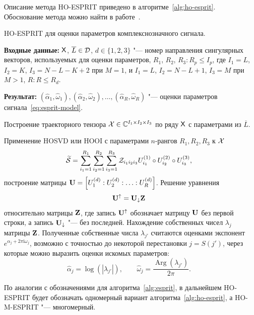 \documentclass[specialist,
  substylefile=spbu_report.rtx,
subf,href,colorlinks=true, 12pt]{disser}
\theoremstyle{plain}
\theoremstyle{definition}
\theoremstyle{remark}
\newcommand{\Input}{\textbf{Входные данные: }}
\newcommand{\Output}{\textbf{Результат: }}
\newcommand{\iu}{\mathrm{i}}
\begin{document}
Описание метода HO-ESPRIT приведено в алгоритме~\ref{alg:ho-esprit}.
Обоснование метода можно найти в работе~\cite{hosvd-hooi-separation}.
\begin{algorithm}[!ht]
  \caption{HO-ESPRIT для оценки параметров комплекснозначного сигнала.}
  \label{alg:ho-esprit}
  \Input $\mathsf{X}$, $\overline{L} \in \mathcal{D}$,
  $d\in \{1, 2, 3\}$ "--- номер направления сингулярных векторов,
  используемых для оценки параметров,
  $R_1$, $R_2$, $R_3: R_p \leqslant I_p$, где
  $I_1=L$, $I_2=K$, $I_3=N-L-K+2$ при $M=1$, и
  $I_1=L$, $I_2=N-L+1$, $I_3=M$ при $M >1$,
  $R: R\leqslant R_d$.

  \Output $\left(\widehat{\alpha}_1, \widehat{\omega}_1\right),
  \left(\widehat{\alpha}_2, \widehat{\omega}_2\right), \ldots,
  \left(\widehat{\alpha}_R, \widehat{\omega}_R\right)$ "--- оценки параметров
  сигнала~\eqref{eq:esprit-model}.
  \begin{algorithmic}[1]
    \State Построение траекторного тензора $\mathcal{X}\in \mathbb{C}^{I_1\times
    I_2 \times I_3}$
    по ряду $\mathsf{X}$ с параметрами из $\overline{L}$.

    \State Применение HOSVD или HOOI с параметрами $n$-рангов $R_1,
    R_2, R_3$ к $\mathcal{X}$
    \[
      \widetilde{\mathcal{S}} = \sum_{i_1=1}^{R_1} \sum_{i_2=1}^{R_2}
      \sum_{i_3=1}^{R_3}
      \mathcal{Z}_{i_1 i_2 i_3} U_{i_1}^{(1)}\circ U_{i_2}^{(2)} \circ
      U_{i_3}^{(3)},
    \]
    построение матрицы $\mathbf{U} = \left[U_1^{(d)}:U_2^{(d)}:\ldots:
    U_{R}^{(d)}\right]$.
    \State Решение уравнения
    \[
      \mathbf{U}^{\uparrow}=\mathbf{U}_{\downarrow}\mathbf{Z}
    \]
    относительно матрицы $\mathbf{Z}$, где запись $\mathbf{U}^{\uparrow}$
    обозначает матрицу $\mathbf{U}$ без первой строки,
    а запись $\mathbf{U}_{\downarrow}$ "--- без последней.
    \State Нахождение собственных
    чисел $\lambda_j$ матрицы $\mathbf{Z}$.
    Полученные собственные числа $\lambda_{j'}$ считаются оценками
    экспонент $e^{\alpha_j + 2\pi\iu \omega_j}$, возможно с точностью
    до некоторой перестановки
    $j = S (j')$, через которые можно выразить
    оценки искомых параметров:
    \[
      \widehat{\alpha}_j = \log\left(\left|\lambda_{j'}\right|\right), \qquad
      \widehat{\omega}_j =
      \frac{\operatorname{Arg}\left(\lambda_{j'}\right)}{2 \pi}.
    \]
  \end{algorithmic}
\end{algorithm}

По аналогии с обозначениями для алгоритма~\ref{alg:esprit},
в дальнейшем HO-ESPRIT будет обозначать одномерный вариант
алгоритма~\ref{alg:ho-esprit}, а HO-M-ESPRIT "--- многомерный.
\end{document}
